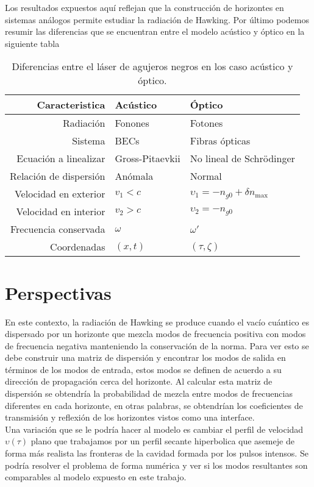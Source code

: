 Los resultados expuestos aqu\'{i} reflejan que la construcci\'{o}n de horizontes en sistemas an\'{a}logos permite estudiar la radiaci\'{o}n de Hawking. Por \'{u}ltimo podemos resumir las diferencias que se encuentran entre el modelo ac\'{u}stico y  \'{o}ptico en la siguiente tabla

\begin{table}[htb]
\centering
\begin{tabular}{|r|l|l|}
\hline
Caracteristica & Ac\'{u}stico& \'{O}ptico \\
\hline \hline
Radiaci\'{o}n & Fonones&Fotones\\ \hline
Sistema & BECs&Fibras \'{o}pticas \\ \hline
Ecuaci\'{o}n a linealizar & Gross-Pitaevkii& No lineal de Schr\"odinger \\ \hline
Relaci\'{o}n de dispersi\'{o}n&An\'{o}mala&Normal\\ \hline
Velocidad en exterior& $v_1<c$&$\upsilon_1=-n_{g0}+\delta n_{\text{max}}$\\ \hline
Velocidad en interior& $v_2>c$&$\upsilon_2=-n_{g0}$\\ \hline
Frecuencia conservada&$\omega$&$\omega'$\\ \hline
Coordenadas&$(x,t)$&$(\tau,\zeta)$\\ \hline
\end{tabular}

\caption{Diferencias entre el l\'{a}ser de agujeros negros en los caso ac\'{u}stico y \'{o}ptico.}
\label{tabla:anchofijo}
\end{table}


\section{Perspectivas}
En este contexto, la radiaci\'{o}n de Hawking se produce cuando el vac\'{i}o cu\'{a}ntico es dispersado por un horizonte que mezcla modos de frecuencia positiva con modos de frecuencia negativa manteniendo la conservaci\'{o}n de la norma. Para ver esto se debe construir una matriz de dispersi\'{o}n y encontrar los modos de salida en t\'{e}rminos de los modos de entrada, estos modos se definen de acuerdo a su direcci\'{o}n de propagaci\'{o}n cerca del horizonte. Al calcular esta matriz de dispersi\'{o}n se obtendr\'{i}a la probabilidad de mezcla entre modos de frecuencias diferentes en cada horizonte, en otras palabras, se obtendr\'ian los coeficientes de transmisi\'{o}n y reflexi\'{o}n de los horizontes vistos como una interface. \\

Una variaci\'on que se le podr\'{i}a hacer al modelo es cambiar el perfil de velocidad $\upsilon(\tau)$ plano que trabajamos por un perfil secante hiperbolica que asemeje de forma m\'as realista las fronteras de la cavidad formada por los pulsos intensos. Se podr\'ia resolver el problema de forma num\'{e}rica y ver si los modos resultantes son comparables al modelo expuesto en este trabajo. 